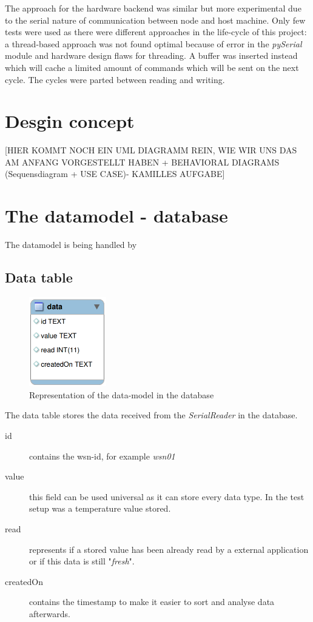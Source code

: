 The approach for the hardware backend was similar but more experimental due to the serial nature of communication between node and host machine. Only
few tests were used as there were different approaches in the life-cycle of this project: a thread-based approach was not found optimal because 
of error in the \textit{pySerial} module and hardware design flaws for threading. A buffer was inserted instead which will cache a limited amount of commands which
will be sent on the next cycle. The cycles were parted between reading and writing.

\section{Desgin concept}
[HIER KOMMT NOCH EIN UML DIAGRAMM REIN, WIE WIR UNS DAS AM ANFANG VORGESTELLT HABEN  + BEHAVIORAL DIAGRAMS (Sequensdiagram + USE CASE)- KAMILLES AUFGABE]

\newpage
\section{The datamodel - database}
The datamodel is being handled by 

\subsection{Data table}
\begin{figure}[H]
	\centering
	\includegraphics[width=0.3\textwidth]{pic/DatamodelData.png}%
    \caption{Representation of the data-model in the database}
    \label{DatamodelDatapic}%
\end{figure}

The data table stores the data received from the \textit{SerialReader} in the database.

\begin{description}
	\item[id] contains the wsn-id, for example \textit{wsn01}
	\item[value] this field can be used universal as it can store every data type. In the test setup was a temperature value stored.
	\item[read] represents if a stored value has been already read by a external application or if this data is still "\textit{fresh}".
	\item[createdOn] contains the timestamp to make it easier to sort and analyse data afterwards.
\end{description}

